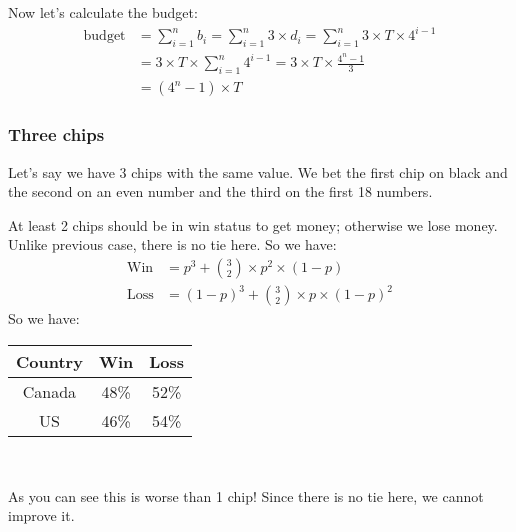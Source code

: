 \documentclass{book}
\begin{document}
	Now let's calculate the budget:
	\begin{equation*}
		\begin{split}
			\text{budget} &= \sum_{i = 1}^{n}{b_i} = \sum_{i = 1}^{n}{3 \times d_i} = \sum_{i = 1}^{n}{3 \times T \times 4^{i - 1}} \\
			&= 3 \times T \times \sum_{i = 1}^{n}{4^{i - 1}} = 3 \times T \times \frac{4^n - 1}{3} \\
			&= (4^n - 1) \times T
		\end{split}
	\end{equation*}
	\subsubsection{Three chips}
	Let's say we have 3 chips with the same value. We bet the first chip on black and the second on an even number and the third on the first 18 numbers.
	\par At least 2 chips should be in win status to get money; otherwise we lose money. Unlike previous case, there is no tie here. So we have:
	\begin{equation*}
		\begin{split}
			\text{Win} &= p^3 + \binom{3}{2} \times p^2 \times (1 - p) \\
			\text{Loss} &= (1 - p)^3 + \binom{3}{2} \times p \times (1 - p)^2
		\end{split}
	\end{equation*}
	So we have: \\
	\par
	\begin{tabular}[h!]{c c c}
	\toprule
	Country & Win & Loss \\
	\midrule
	Canada & 48\% & 52\% \\
	US & 46\% & 54\% \\
	\bottomrule
\end{tabular} \\
	\par
	\par As you can see this is worse than 1 chip! Since there is no tie here, we cannot improve it.
\end{document}

